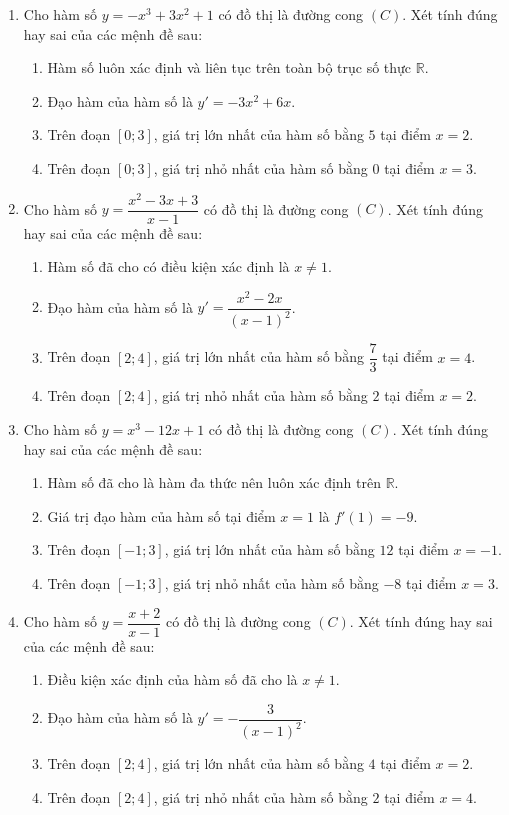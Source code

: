 \documentclass[12pt]{article}
\begin{document}
\begin{enumerate}[label=\textbf{Câu \arabic*.}]
		\item Cho hàm số $y = -x^3 + 3x^2 + 1$ có đồ thị là đường cong $(C)$. Xét tính đúng hay sai của các mệnh đề sau:
		\begin{enumerate}[label=\alph*)]
			\item Hàm số luôn xác định và liên tục trên toàn bộ trục số thực $\mathbb{R}$.
			\item Đạo hàm của hàm số là $y' = -3x^2 + 6x$.
			\item Trên đoạn $[0; 3]$, giá trị lớn nhất của hàm số bằng $5$ tại điểm $x = 2$.
			\item Trên đoạn $[0; 3]$, giá trị nhỏ nhất của hàm số bằng $0$ tại điểm $x = 3$.
		\end{enumerate}
		
		\item Cho hàm số $y = \dfrac{x^2 - 3x + 3}{x - 1}$ có đồ thị là đường cong $(C)$. Xét tính đúng hay sai của các mệnh đề sau:
		\begin{enumerate}[label=\alph*)]
			\item Hàm số đã cho có điều kiện xác định là $x \neq 1$.
			\item Đạo hàm của hàm số là $y' = \dfrac{x^2 - 2x}{(x-1)^2}$.
			\item Trên đoạn $[2; 4]$, giá trị lớn nhất của hàm số bằng $\dfrac{7}{3}$ tại điểm $x = 4$.
			\item Trên đoạn $[2; 4]$, giá trị nhỏ nhất của hàm số bằng $2$ tại điểm $x = 2$.
		\end{enumerate}
		
		\item Cho hàm số $y = x^3 - 12x + 1$ có đồ thị là đường cong $(C)$. Xét tính đúng hay sai của các mệnh đề sau:
		\begin{enumerate}[label=\alph*)]
			\item Hàm số đã cho là hàm đa thức nên luôn xác định trên $\mathbb{R}$.
			\item Giá trị đạo hàm của hàm số tại điểm $x = 1$ là $f'(1) = -9$.
			\item Trên đoạn $[-1; 3]$, giá trị lớn nhất của hàm số bằng $12$ tại điểm $x = -1$.
			\item Trên đoạn $[-1; 3]$, giá trị nhỏ nhất của hàm số bằng $-8$ tại điểm $x = 3$.
		\end{enumerate}
		
		\item Cho hàm số $y = \dfrac{x + 2}{x - 1}$ có đồ thị là đường cong $(C)$. Xét tính đúng hay sai của các mệnh đề sau:
		\begin{enumerate}[label=\alph*)]
			\item Điều kiện xác định của hàm số đã cho là $x \neq 1$.
			\item Đạo hàm của hàm số là $y' = -\dfrac{3}{(x-1)^2}$.
			\item Trên đoạn $[2; 4]$, giá trị lớn nhất của hàm số bằng $4$ tại điểm $x = 2$.
			\item Trên đoạn $[2; 4]$, giá trị nhỏ nhất của hàm số bằng $2$ tại điểm $x = 4$.
		\end{enumerate}
		

\end{enumerate}
\end{document}

